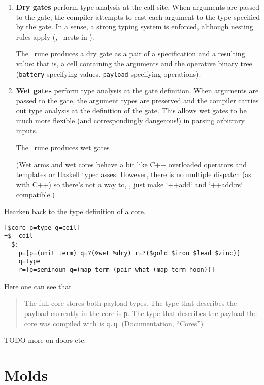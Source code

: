 \begin{enumerate}
  \item  \textbf{Dry gates} perform type analysis at the call site.  When arguments are passed to the gate, the compiler attempts to cast each argument to the type specified by the gate.  In a sense, a strong typing system is enforced, although nesting rules apply (\eg, \patud~nests in \patu).

    The \pbartis~rune produces a dry gate as a pair of a specification and a resulting value:  that is, a cell containing the arguments and the operative binary tree (\texttt{battery} specifying values, \texttt{payload} specifying operations).

  \item  \textbf{Wet gates} perform type analysis at the gate definition.  When arguments are passed to the gate, the argument types are preserved and the compiler carries out type analysis at the definition of the gate.  This allows wet gates to be much more flexible (and correspondingly dangerous!) in parsing arbitrary inputs.

    The \bartar~rune produces wet gates

    \marginnote[2mm](Wet arms and wet cores behave a bit like C++ overloaded operators and templates or Haskell typeclasses.  However, there is no multiple dispatch (as with C++) so there's not a way to, \eg, just make `++add` and `++add:rs` compatible.)
\end{enumerate}

Hearken back to the type definition of a core.

\begin{lstlisting}
[$core p=type q=coil]
+$  coil
  $:
    p=[p=(unit term) q=?(%wet %dry) r=?($gold $iron $lead $zinc)]
    q=type
    r=[p=seminoun q=(map term (pair what (map term hoon))]
\end{lstlisting}

Here one can see that

\begin{quote}
The full core stores both payload types.  The type that describes the payload currently in the core is \texttt{p}.  The type that describes the payload the core was compiled with is \texttt{q.q}.  (Documentation, “Cores”)
\end{quote}

TODO more on doors etc.


\section{Molds}

